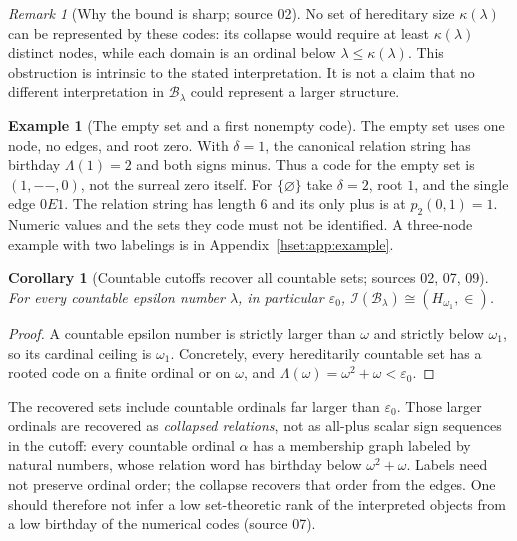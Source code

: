 \documentclass[11pt,letterpaper]{article}
\newtheorem{corollary}[corollary]{Corollary}\aliascntresetthe{corollary}
\theoremstyle{definition}
\newtheorem{example}[example]{Example}\aliascntresetthe{example}
\theoremstyle{remark}
\newtheorem{remark}[remark]{Remark}\aliascntresetthe{remark}
\newcommand{\B}{\mathcal B}
\newcommand{\I}{\mathcal I}
\begin{document}
\begin{remark}[Why the bound is sharp; source 02]\label{hset:rem:sharp}
No set of hereditary size $\kappa(\lambda)$ can be represented by these codes:
its collapse would require at least $\kappa(\lambda)$ distinct nodes, while
each domain is an ordinal below $\lambda\le\kappa(\lambda)$. This obstruction
is intrinsic to the stated interpretation. It is not a claim that no
different interpretation in $\B_\lambda$ could represent a larger structure.
\end{remark}

\begin{example}[The empty set and a first nonempty code]
\label{hset:ex:first-codes}
The empty set uses one node, no edges, and root zero. With $\delta=1$, the
canonical relation string has birthday $\Lambda(1)=2$ and both signs minus.
Thus a code for the empty set is $(1,--,0)$, not the surreal zero itself.
For $\{\varnothing\}$ take $\delta=2$, root $1$, and the single edge
$0E1$. The relation string has length $6$ and its only plus is at
$p_2(0,1)=1$. Numeric values and the sets they code must not be identified.
A three-node example with two labelings is in Appendix~\ref{hset:app:example}.
\end{example}

\begin{corollary}[Countable cutoffs recover all countable sets; sources 02, 07, 09]
\label{hset:cor:countable}
For every countable epsilon number $\lambda$, in particular $\varepsilon_0$,
$\I(\B_\lambda)\cong(H_{\omega_1},\in)$.
\end{corollary}
\begin{proof}
A countable epsilon number is strictly larger than $\omega$ and strictly below
$\omega_1$, so its cardinal ceiling is $\omega_1$. Concretely, every
hereditarily countable set has a rooted code on a finite ordinal or on
$\omega$, and $\Lambda(\omega)=\omega^2+\omega<\varepsilon_0$.
\end{proof}

The recovered sets include countable ordinals far larger than $\varepsilon_0$.
Those larger ordinals are recovered as \emph{collapsed relations}, not as
all-plus scalar sign sequences in the cutoff: every countable ordinal $\alpha$
has a membership graph labeled by natural numbers, whose relation word has
birthday below $\omega^2+\omega$. Labels need not preserve ordinal order; the
collapse recovers that order from the edges. One should therefore not infer a
low set-theoretic rank of the interpreted objects from a low birthday of the
numerical codes (source 07).
\end{document}
